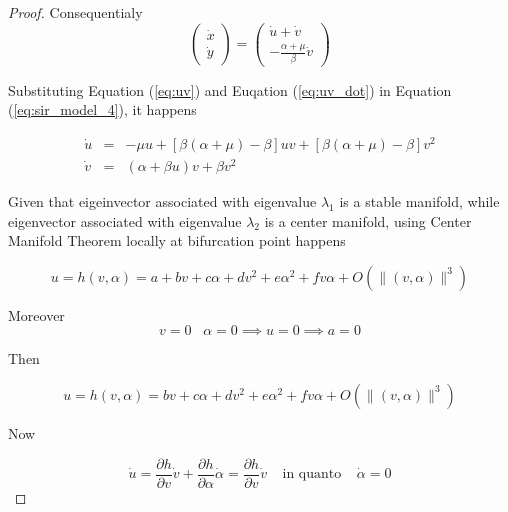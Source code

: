 \begin{proof}
Consequentialy
\begin{equation}
    \label{eq:uv_dot}
    \begin{pmatrix} \dot{x} \\ \dot{y} \end{pmatrix}
    = \begin{pmatrix} \dot{u} + \dot{v} \\ -\frac{\alpha + \mu}{\beta} \dot{v} \end{pmatrix}
\end{equation}

Substituting Equation (\ref{eq:uv}) and Euqation (\ref{eq:uv_dot}) in Equation (\ref{eq:sir_model_4}), it happens

\begin{equation}
    \label{eq:sir_model_5}
    \begin{array}{ccc}
        \dot{u} &=& -\mu u + \left[ \beta(\alpha+\mu)-\beta \right]uv + \left[ \beta(\alpha + \mu) -\beta \right]v^2 \\
        \dot{v} &=& (\alpha + \beta u)v + \beta v^2
    \end{array}
\end{equation}

Given that eigeinvector associated with eigenvalue $\lambda_1$ is a stable manifold, while eigenvector associated with eigenvalue $\lambda_2$ is a center manifold, using Center Manifold Theorem \cite[pp. 303]{bib:khalil} locally at bifurcation point happens

\begin{equation}
    u = h(v,\alpha) = a+bv+c\alpha+dv^2+e\alpha^2+fv\alpha+O\left(\|(v,\alpha)\|^3\right)
\end{equation}

Moreover
\begin{equation}
    v = 0 \;\;\; \alpha = 0 \implies u = 0 \implies a = 0
\end{equation}

Then

\begin{equation}
    \label{eq:u_1}
    u = h(v,\alpha) = bv+c\alpha+dv^2+e\alpha^2+fv\alpha+O\left(\|(v,\alpha)\|^3\right)
\end{equation}

Now

\begin{equation}
    \label{eq:dotu_1}
    \dot{u} = \frac{\partial h}{\partial v}\dot{v} + \frac{\partial h}{\partial \alpha}\dot{\alpha} = \frac{\partial h}{\partial v}\dot{v} \;\;\;\; \text{in quanto} \;\;\;\; \dot{\alpha} = 0
\end{equation}


\end{proof}
